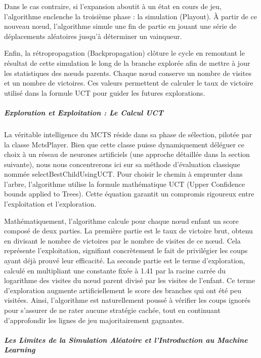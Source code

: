 \documentclass[a4paper]{article}
\begin{document}
Dans le cas contraire, si l'expansion aboutit à un état en cours de jeu, l'algorithme enclenche la troisième phase : la simulation (Playout). À partir de ce nouveau nœud, l'algorithme simule une fin de partie en jouant une série de déplacements aléatoires jusqu'à déterminer un vainqueur.

Enfin, la rétropropagation (Backpropagation) clôture le cycle en remontant le résultat de cette simulation le long de la branche explorée afin de mettre à jour les statistiques des nœuds parents. Chaque nœud conserve un nombre de visites et un nombre de victoires. Ces valeurs permettent de calculer le taux de victoire utilisé dans la formule UCT pour guider les futures explorations.

\subparagraph{Exploration et Exploitation : Le Calcul UCT}

La véritable intelligence du MCTS réside dans sa phase de sélection, pilotée par la classe MctsPlayer. Bien que cette classe puisse dynamiquement déléguer ce choix à un réseau de neurones artificiels (une approche détaillée dans la section suivante), nous nous concentrerons ici sur sa méthode d'évaluation classique nommée selectBestChildUsingUCT. Pour choisir le chemin à emprunter dans l'arbre, l'algorithme utilise la formule mathématique UCT (Upper Confidence bounds applied to Trees). Cette équation garantit un compromis rigoureux entre l'exploitation et l'exploration.

Mathématiquement, l'algorithme calcule pour chaque nœud enfant un score composé de deux parties. La première partie est le taux de victoire brut, obtenu en divisant le nombre de victoires par le nombre de visites de ce nœud. Cela représente l'exploitation, signifiant concrètement le fait de privilégier les coups ayant déjà prouvé leur efficacité. La seconde partie est le terme d'exploration, calculé en multipliant une constante fixée à 1.41 par la racine carrée du logarithme des visites du nœud parent divisé par les visites de l'enfant. Ce terme d'exploration augmente artificiellement le score des branches qui ont été peu visitées. Ainsi, l'algorithme est naturellement poussé à vérifier les coups ignorés pour s'assurer de ne rater aucune stratégie cachée, tout en continuant d'approfondir les lignes de jeu majoritairement gagnantes.



\subparagraph{Les Limites de la Simulation Aléatoire et l'Introduction au Machine Learning}
\end{document}
